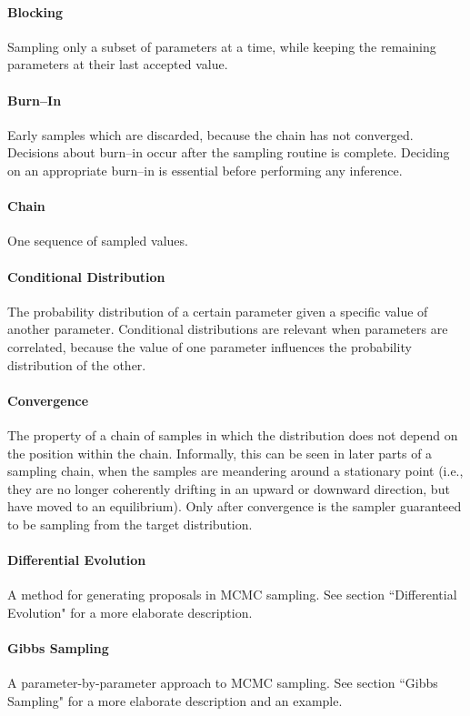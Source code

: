 	\paragraph{Blocking} Sampling only a subset of parameters at a time, while keeping the remaining parameters at their last accepted value.
	\paragraph{Burn--In} Early samples which are discarded, because the chain has not converged. Decisions about burn--in occur after the sampling routine is complete. Deciding on an appropriate burn--in is essential before performing any inference. 
	\paragraph{Chain} One sequence of sampled values.
	\paragraph{Conditional Distribution} The probability distribution of a certain parameter given a specific value of another parameter. Conditional distributions are relevant when parameters are correlated, because the value of one parameter influences the probability distribution of the other.
	\paragraph{Convergence} The property of a chain of samples in which the distribution does not depend on the position within the chain. Informally, this can be seen in later parts of a sampling chain, when the samples are meandering around a stationary point (i.e., they are no longer coherently drifting in an upward or downward direction, but have moved to an equilibrium). Only after convergence is the sampler guaranteed to be sampling from the target distribution.
	\paragraph{Differential Evolution} A method for generating proposals in MCMC sampling. See section ``Differential Evolution" for a more elaborate description.
	\paragraph{Gibbs Sampling} A parameter-by-parameter approach to MCMC sampling. See section ``Gibbs Sampling" for a more elaborate description and an example.
